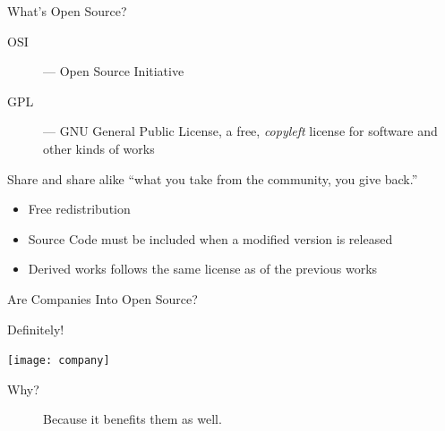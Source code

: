 \begin{frame}{What's Open Source?}
  \begin{description}
  \item[OSI] --- Open Source Initiative
  \item[GPL] --- GNU General Public License, a free, \emph{copyleft} license for software and
    other kinds of works
  \end{description}
  \begin{block}{Share and share alike}
    {\small\purisa ``what you take from the community, you give back.''}
    \begin{itemize}
    \item Free redistribution
    \item Source Code must be included when a modified version is
      released
    \item Derived works follows the same license as of the previous
      works
    \end{itemize}
  \end{block}
\end{frame}

\begin{frame}{Are Companies Into Open Source?}
  \begin{block}{Definitely!}
    \begin{center}
      \texttt{[image: company]}
    \end{center}
  \end{block}
  \begin{description}
  \item[Why?]  Because it benefits them as well.
  \end{description}
\end{frame}

